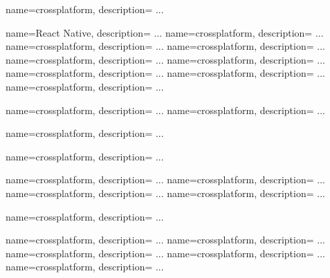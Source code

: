 
 {
  name=crossplatform,
  description={
		...
	}
}

 {
  name=React Native,
  description={
		...
	}
}
 {
  name=crossplatform,
  description={
		...
	}
}
 {
  name=crossplatform,
  description={
		...
	}
}
 {
  name=crossplatform,
  description={
		...
	}
}
 {
  name=crossplatform,
  description={
		...
	}
}
 {
  name=crossplatform,
  description={
		...
	}
}
 {
  name=crossplatform,
  description={
		...
	}
}
 {
  name=crossplatform,
  description={
		...
	}
}
 {
  name=crossplatform,
  description={
		...
	}
}

 {
  name=crossplatform,
  description={
		...
	}
}
 {
  name=crossplatform,
  description={
		...
	}
}

 {
  name=crossplatform,
  description={
		...
	}
}

 {
  name=crossplatform,
  description={
		...
	}
}

 {
  name=crossplatform,
  description={
		...
	}
}
 {
  name=crossplatform,
  description={
		...
	}
}
 {
  name=crossplatform,
  description={
		...
	}
}
 {
  name=crossplatform,
  description={
		...
	}
}

 {
  name=crossplatform,
  description={
		...
	}
}

 {
  name=crossplatform,
  description={
		...
	}
}
 {
  name=crossplatform,
  description={
		...
	}
}
 {
  name=crossplatform,
  description={
		...
	}
}
 {
  name=crossplatform,
  description={
		...
	}
}
 {
  name=crossplatform,
  description={
		...
	}
}


